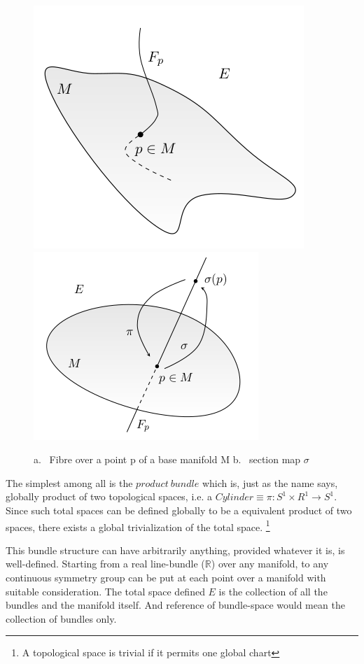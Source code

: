 \documentclass[8pt, twocoloumn]{article}
\begin{document}
\begin{figure}[h!]
\begin{center}
\includegraphics[scale = 0.4]{justbundle.png}
\hspace{0.2 in}
\includegraphics[scale = 0.4]{sectionmap.png}
\caption{a. \ Fibre over a point p of a base manifold M  b. \ section map $\sigma$}
\end{center}
\end{figure}

The simplest among all is the $product \ bundle$ which is, just as the name says, globally product of two topological spaces, i.e. a $Cylinder \equiv \pi : S^1 \times R^1 \to S^1$. Since such total spaces can be defined globally to be a equivalent product of two spaces, there exists a global trivialization of the total space. \footnote{A topological space is trivial if it permits one global chart}

This bundle structure can have arbitrarily anything, provided whatever it is, is well-defined. Starting from a real line-bundle ($\mathbb{R}$) over any manifold, to any continuous symmetry group can be put at each point over a manifold with suitable consideration. The total space defined $E$ is the collection of all the bundles and the manifold itself. And reference of bundle-space would mean the collection of bundles only. 
\end{document}
